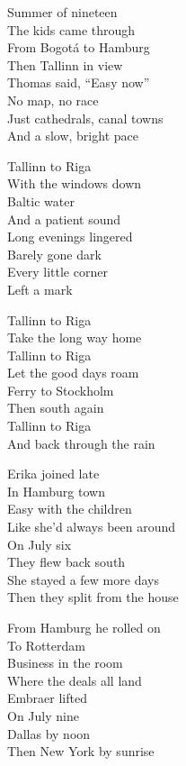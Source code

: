 \begin{lyrics}
Summer of nineteen\\
The kids came through\\
From Bogotá to Hamburg\\
Then Tallinn in view\\
Thomas said, “Easy now”\\
No map, no race\\
Just cathedrals, canal towns\\
And a slow, bright pace

Tallinn to Riga\\
With the windows down\\
Baltic water\\
And a patient sound\\
Long evenings lingered\\
Barely gone dark\\
Every little corner\\
Left a mark

Tallinn to Riga\\
Take the long way home\\
Tallinn to Riga\\
Let the good days roam\\
Ferry to Stockholm\\
Then south again\\
Tallinn to Riga\\
And back through the rain

Erika joined late\\
In Hamburg town\\
Easy with the children\\
Like she’d always been around\\
On July six\\
They flew back south\\
She stayed a few more days\\
Then they split from the house

From Hamburg he rolled on\\
To Rotterdam\\
Business in the room\\
Where the deals all land\\
Embraer lifted\\
On July nine\\
Dallas by noon\\
Then New York by sunrise


\end{lyrics}
